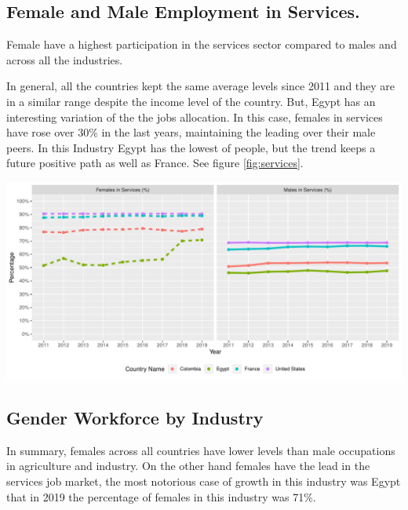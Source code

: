 \documentclass[11pt,a4paper,]{article}
\let\origfigure\figure
\let\endorigfigure\endfigure
\renewenvironment{figure}[1][2] {
    \expandafter\origfigure\expandafter[H]
} {
    \endorigfigure
}
\begin{document}
\hypertarget{female-and-male-employment-in-services.}{%
\subsection{Female and Male Employment in Services.}\label{female-and-male-employment-in-services.}}

Female have a highest participation in the services sector compared to males and across all the industries.

In general, all the countries kept the same average levels since 2011 and they are in a similar range despite the income level of the country. But, Egypt has an interesting variation of the the jobs allocation. In this case, females in services have rose over 30\% in the last years, maintaining the leading over their male peers. In this Industry Egypt has the lowest of people, but the trend keeps a future positive path as well as France. See figure \ref{fig:services}.

\begin{figure}
\centering
\includegraphics{The_Outsiders_5513_files/figure-latex/services-1.pdf}
\caption{\label{fig:services}Female and Male Employment in Services}
\end{figure}

\hypertarget{gender-workforce-by-industry}{%
\subsection{Gender Workforce by Industry}\label{gender-workforce-by-industry}}

In summary, females across all countries have lower levels than male occupations in agriculture and industry. On the other hand females have the lead in the services job market, the most notorious case of growth in this industry was Egypt that in 2019 the percentage of females in this industry was 71\%.
\end{document}
